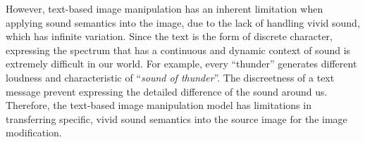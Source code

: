 \documentclass[10pt,twocolumn,letterpaper]{article}
\def\authornote#1#2#3{{\textcolor{#2}{\textsl{\small[#1: #3]}}}}
\newcommand{\wonmin}[1]{\authornote{Wonmin}{Blue}{#1}} %
\begin{document}
However, text-based image manipulation has an inherent limitation when applying sound semantics into the image, 
due to the lack of handling vivid sound, which has infinite variation.
Since the text is the form of discrete character, expressing the spectrum that has a continuous and dynamic context of sound is extremely difficult in our world. 
For example, every ``thunder'' generates different loudness and characteristic of ``\textit{sound of thunder}''.
The discreetness of a text message prevent expressing the detailed difference of the sound around us.
Therefore, the text-based image manipulation model has limitations in transferring specific, vivid sound semantics into the source image for the image modification. 
%
\end{document}
